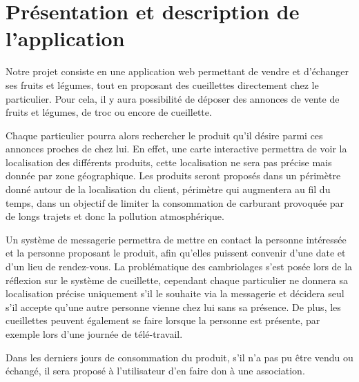 \documentclass{article}
\begin{document}
\section{Présentation et description de l'application}

Notre projet consiste en une application web permettant de vendre et d'échanger ses fruits et légumes, tout en proposant des cueillettes directement chez le particulier. Pour cela, il y aura possibilité de déposer des annonces de vente de fruits et légumes, de troc ou encore de cueillette. 

Chaque particulier pourra alors rechercher le produit qu'il désire parmi ces annonces proches de chez lui. En effet, une carte interactive permettra de voir la localisation des différents produits, cette localisation ne sera pas précise mais donnée par zone géographique. Les produits seront proposés dans un périmètre donné autour de la localisation du client, périmètre qui augmentera au fil du temps, dans un objectif de limiter la consommation de carburant provoquée par de longs trajets et donc la pollution atmosphérique. 

Un système de messagerie permettra de mettre en contact la personne intéressée et la personne proposant le produit, afin qu'elles puissent convenir d'une date et d'un lieu de rendez-vous. 
La problématique des cambriolages s'est posée lors de la réflexion sur le système de cueillette, cependant chaque particulier ne donnera sa localisation précise uniquement s'il le souhaite via la messagerie et décidera seul s'il accepte qu'une autre personne vienne chez lui sans sa présence. De plus, les cueillettes peuvent également se faire lorsque la personne est présente, par exemple lors d'une journée de télé-travail.

Dans les derniers jours de consommation du produit, s'il n'a pas pu être vendu ou échangé, il sera proposé à l'utilisateur d'en faire don à une association. 
\end{document}
